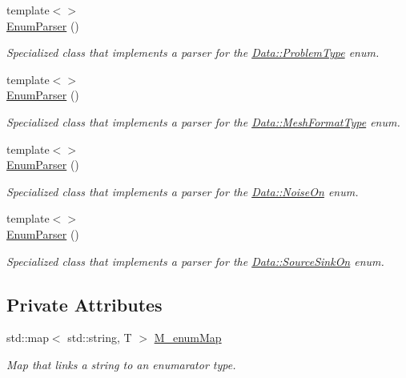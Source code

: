 \begin{DoxyCompactItemize}
{\footnotesize template$<$$>$ }\\\hyperlink{classFVCode3D_1_1EnumParser_a1f83e7583927bff1f4c217386240b2a1}{Enum\+Parser} ()
\begin{DoxyCompactList}\small\item\em Specialized class that implements a parser for the \hyperlink{classFVCode3D_1_1Data_af17933074f5acdb699179763e6f43f23}{Data\+::\+Problem\+Type} enum. \end{DoxyCompactList}\item 
{\footnotesize template$<$$>$ }\\\hyperlink{classFVCode3D_1_1EnumParser_a2fa5564d3682f4ce83ac27e621f4a4e7}{Enum\+Parser} ()
\begin{DoxyCompactList}\small\item\em Specialized class that implements a parser for the \hyperlink{classFVCode3D_1_1Data_a6a9aa6abc2ca3c85be8578d82a61a9c6}{Data\+::\+Mesh\+Format\+Type} enum. \end{DoxyCompactList}\item 
{\footnotesize template$<$$>$ }\\\hyperlink{classFVCode3D_1_1EnumParser_a15323dff273a1eeaec2fcafd71e349f4}{Enum\+Parser} ()
\begin{DoxyCompactList}\small\item\em Specialized class that implements a parser for the \hyperlink{classFVCode3D_1_1Data_a983fdc14aa355a7c9fd614b9655a3552}{Data\+::\+Noise\+On} enum. \end{DoxyCompactList}\item 
{\footnotesize template$<$$>$ }\\\hyperlink{classFVCode3D_1_1EnumParser_a51d7dcc3ed5b9cdae0391dd596dd2e85}{Enum\+Parser} ()
\begin{DoxyCompactList}\small\item\em Specialized class that implements a parser for the \hyperlink{classFVCode3D_1_1Data_a4d66e2e205b350cb240820540339e1a3}{Data\+::\+Source\+Sink\+On} enum. \end{DoxyCompactList}\end{DoxyCompactItemize}
\subsection*{Private Attributes}
\begin{DoxyCompactItemize}
\item 
std\+::map$<$ std\+::string, T $>$ \hyperlink{classFVCode3D_1_1EnumParser_ac993705140577f6454bb873cb3d89b1b}{M\+\_\+enum\+Map}
\begin{DoxyCompactList}\small\item\em Map that links a string to an enumarator type. \end{DoxyCompactList}\end{DoxyCompactItemize}


